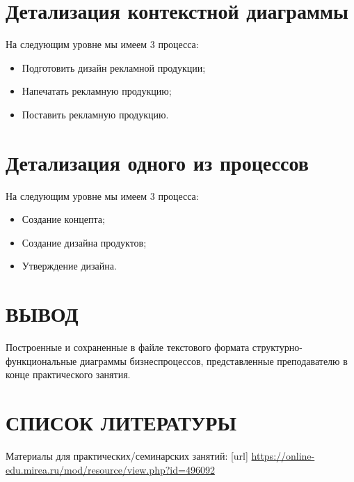 \newpage

\section{Детализация контекстной диаграммы}

На следующим уровне мы имеем 3 процесса:
\begin{itemize}
	\item Подготовить дизайн рекламной продукции;
	\item Напечатать рекламную продукцию;
	\item Поставить рекламную продукцию.
\end{itemize}

\newpage

\section{Детализация одного из процессов}

На следующим уровне мы имеем 3 процесса:
\begin{itemize}
	\item Создание концепта;
	\item Создание дизайна продуктов;
	\item Утверждение дизайна.
\end{itemize}

\newpage

\section*{ВЫВОД}
Построенные и сохраненные в
файле текстового формата структурно-функциональные диаграммы бизнеспроцессов,
представленные преподавателю в конце практического занятия.

\section*{СПИСОК ЛИТЕРАТУРЫ}
\begin{thebibliography}{}
	\bibitem{}  Материалы для практических/семинарских занятий: [url]
	\url{https://online-edu.mirea.ru/mod/resource/view.php?id=496092}
\end{thebibliography}
